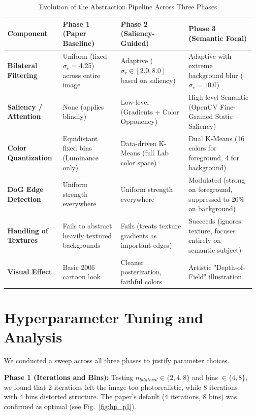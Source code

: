 \documentclass[conference]{IEEEtran}
\begin{document}
\begin{table}[t]
\caption{Evolution of the Abstraction Pipeline Across Three Phases}
\label{tab:phase_diff}
\begin{center}
\begin{tabular}{lp{4cm}p{4cm}p{4cm}}
\toprule
\textbf{Component} & \textbf{Phase 1 (Paper Baseline)} & \textbf{Phase 2 (Saliency-Guided)} & \textbf{Phase 3 (Semantic Focal)} \\
\midrule
\textbf{Bilateral Filtering} & Uniform (fixed $\sigma_r$ = 4.25) across entire image & Adaptive ($\sigma_r \in [2.0, 8.0]$ based on saliency) & Adaptive with extreme background blur ($\sigma_r=10.0$) \\
\textbf{Saliency / Attention} & None (applies blindly) & Low-level (Gradients + Color Opponency) & High-level Semantic (OpenCV Fine-Grained Static Saliency) \\
\textbf{Color Quantization} & Equidistant fixed bins (Luminance only) & Data-driven K-Means (full Lab color space) & Dual K-Means (16 colors for foreground, 4 for background) \\
\textbf{DoG Edge Detection} & Uniform strength everywhere & Uniform strength everywhere & Modulated (strong on foreground, suppressed to 20\% on background) \\
\textbf{Handling of Textures} & Fails to abstract heavily textured backgrounds & Fails (treats texture gradients as important edges) & Succeeds (ignores texture, focuses entirely on semantic subject) \\
\textbf{Visual Effect} & Basic 2006 cartoon look & Cleaner posterization, faithful colors & Artistic "Depth-of-Field" illustration \\
\bottomrule
\end{tabular}
\end{center}
\end{table}

\section{Hyperparameter Tuning and Analysis}
We conducted a sweep across all three phases to justify parameter choices.

\textbf{Phase 1 (Iterations and Bins):} Testing $n_{bilateral} \in \{2, 4, 8\}$ and bins $\in \{4, 8\}$, we found that 2 iterations left the image too photorealistic, while 8 iterations with 4 bins distorted structure. The paper's default (4 iterations, 8 bins) was confirmed as optimal (see Fig.~\ref{fig:hp_p1}).
\end{document}
